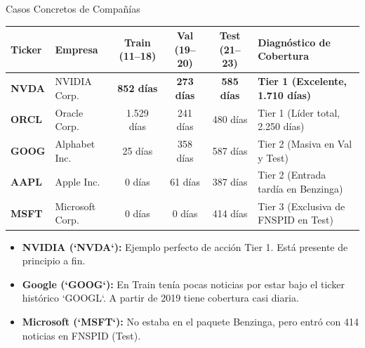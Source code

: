 \documentclass[aspectratio=169,11pt]{beamer}
\begin{document}
\begin{frame}{Casos Concretos de Compañías}
    \begin{table}[]
        \centering \small
        \begin{tabular}{@{}llcccl@{}}
        \toprule
        \textbf{Ticker} & \textbf{Empresa} & \textbf{Train (11--18)} & \textbf{Val (19--20)} & \textbf{Test (21--23)} & \textbf{Diagnóstico de Cobertura} \\ \midrule
        \textbf{NVDA}   & NVIDIA Corp.     & \textbf{852 días}       & \textbf{273 días}     & \textbf{585 días}      & \textbf{Tier 1 (Excelente, 1.710 días)} \\
        \textbf{ORCL}   & Oracle Corp.     & 1.529 días              & 241 días              & 480 días               & Tier 1 (Líder total, 2.250 días) \\
        \textbf{GOOG}   & Alphabet Inc.    & 25 días                 & 358 días              & 587 días               & Tier 2 (Masiva en Val y Test) \\
        \textbf{AAPL}   & Apple Inc.       & 0 días                  & 61 días               & 387 días               & Tier 2 (Entrada tardía en Benzinga) \\
        \textbf{MSFT}   & Microsoft Corp.  & 0 días                  & 0 días                & 414 días               & Tier 3 (Exclusiva de FNSPID en Test) \\ \bottomrule
        \end{tabular}
    \end{table}
    
    \vspace{0.3cm}
    \begin{itemize}
        \item \textbf{NVIDIA (`NVDA`):} Ejemplo perfecto de acción Tier 1. Está presente de principio a fin.
        \item \textbf{Google (`GOOG`):} En Train tenía pocas noticias por estar bajo el ticker histórico `GOOGL`. A partir de 2019 tiene cobertura casi diaria.
        \item \textbf{Microsoft (`MSFT`):} No estaba en el paquete Benzinga, pero entró con 414 noticias en FNSPID (Test).
    \end{itemize}
\end{frame}
\end{document}
